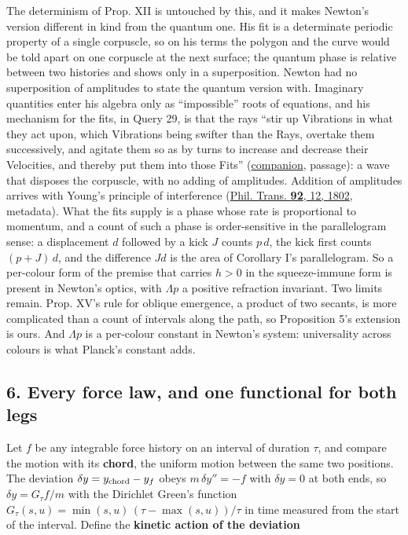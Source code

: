 \documentclass[11pt,a4paper]{article}
\begin{document}
The determinism of Prop. XII is untouched by this, and it makes Newton's
version different in kind from the quantum one. His fit is a determinate
periodic property of a single corpuscle, so on his terms the polygon and
the curve would be told apart on one corpuscle at the next surface; the
quantum phase is relative between two histories and shows only in a
superposition. Newton had no superposition of amplitudes to state the
quantum version with. Imaginary quantities enter his algebra only as
``impossible'' roots of equations, and his mechanism for the fits, in
Query 29, is that the rays ``stir up Vibrations in what they act upon,
which Vibrations being swifter than the Rays, overtake them
successively, and agitate them so as by turns to increase and decrease
their Velocities, and thereby put them into those Fits''
(\href{../docs/classics/Newton_Opticks_1730_fits_and_queries.md}{companion},
passage): a wave that disposes the corpuscle, with no adding of
amplitudes. Addition of amplitudes arrives with Young's principle of
interference (\href{https://doi.org/10.1098/rstl.1802.0004}{Phil. Trans.
\textbf{92}, 12, 1802}, metadata). What the fits supply is a phase whose
rate is proportional to momentum, and a count of such a phase is
order-sensitive in the parallelogram sense: a displacement \(d\)
followed by a kick \(J\) counts \(p\,d\), the kick first counts
\((p+J)\,d\), and the difference \(Jd\) is the area of Corollary I's
parallelogram. So a per-colour form of the premise that carries \(h>0\)
in the squeeze-immune form is present in Newton's optics, with
\(\Lambda p\) a positive refraction invariant. Two limits remain. Prop.
XV's rule for oblique emergence, a product of two secants, is more
complicated than a count of intervals along the path, so Proposition 5's
extension is ours. And \(\Lambda p\) is a per-colour constant in
Newton's system: universality across colours is what Planck's constant
adds.

\hypertarget{every-force-law-and-one-functional-for-both-legs}{%
\subsection{6. Every force law, and one functional for both
legs}\label{every-force-law-and-one-functional-for-both-legs}}

Let \(f\) be any integrable force history on an interval of duration
\(\tau\), and compare the motion with its \textbf{chord}, the uniform
motion between the same two positions. The deviation
\(\delta y=y_{\rm chord}-y_f\) obeys \(m\,\delta y''=-f\) with
\(\delta y=0\) at both ends, so \(\delta y=G_\tau f/m\) with the
Dirichlet Green's function
\(G_\tau(s,u)=\min(s,u)\,(\tau-\max(s,u))/\tau\) in time measured from
the start of the interval. Define the \textbf{kinetic action of the
deviation}
\end{document}
